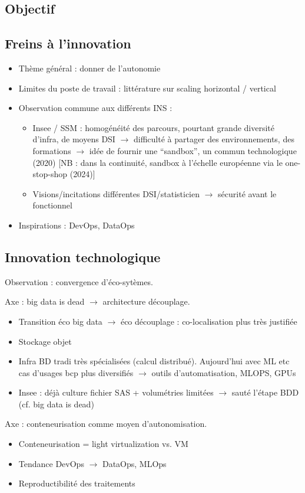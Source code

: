 \subsection{Objectif}
    



\subsection{Freins à l'innovation}
\begin{itemize}
    \item Thème général : donner de l'autonomie
    \item Limites du poste de travail : littérature sur scaling horizontal / vertical
    \item Observation commune aux différents INS :
    \begin{itemize}
        \item Insee / SSM : homogénéité des parcours, pourtant grande diversité d'infra, de moyens DSI $\rightarrow$ difficulté à partager des environnements, des formations $\rightarrow$ idée de fournir une ``sandbox'', un commun technologique (2020) [NB : dans la continuité, sandbox à l'échelle européenne via le one-stop-shop (2024)]
        \item Visions/incitations différentes DSI/statisticien $\rightarrow$ sécurité avant le fonctionnel
    \end{itemize}
    \item Inspirations : DevOps, DataOps
\end{itemize}

\subsection{Innovation technologique}
Observation : convergence d'éco-sytèmes.

Axe : big data is dead $\rightarrow$ architecture découplage.
\begin{itemize}
    \item Transition éco big data $\rightarrow$ éco découplage : co-localisation plus très justifiée
    \item Stockage objet
    \item Infra BD tradi très spécialisées (calcul distribué). Aujourd'hui avec ML etc cas d'usages bcp plus diversifiés $\rightarrow$ outils d'automatisation, MLOPS, GPUs
    \item Insee : déjà culture fichier SAS + volumétries limitées $\rightarrow$ sauté l'étape BDD (cf. big data is dead)
\end{itemize}

Axe : conteneurisation comme moyen d'autonomisation.
\begin{itemize}
    \item Conteneurisation = light virtualization vs. VM
    \item Tendance DevOps $\rightarrow$ DataOps, MLOps
    \item Reproductibilité des traitements
\end{itemize}